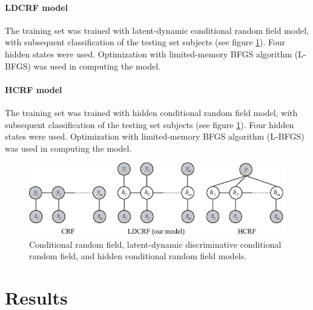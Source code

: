 \documentclass{article}  %
\begin{document}
\paragraph{LDCRF model} 
The training set was trained with latent-dynamic conditional random field model, with subsequent classification of the testing set subjects (see figure \ref{fig:crfModels}). Four hidden states were used. Optimization with limited-memory BFGS algorithm (L-BFGS) was used in computing the model.

\paragraph{HCRF model}
The training set was trained with hidden conditional random field model, with subsequent classification of the testing set subjects  (see figure \ref{fig:crfModels}). Four hidden states were used. Optimization with limited-memory BFGS algorithm (L-BFGS) was used in computing the model.



\begin{figure}[htbp]
\includegraphics{crf_models.jpg}
\caption{Conditional random field, latent-dynamic discriminative conditional random field, and hidden conditional random field models.}
\label{fig:crfModels}
\end{figure}

\section{Results}













\end{document}
